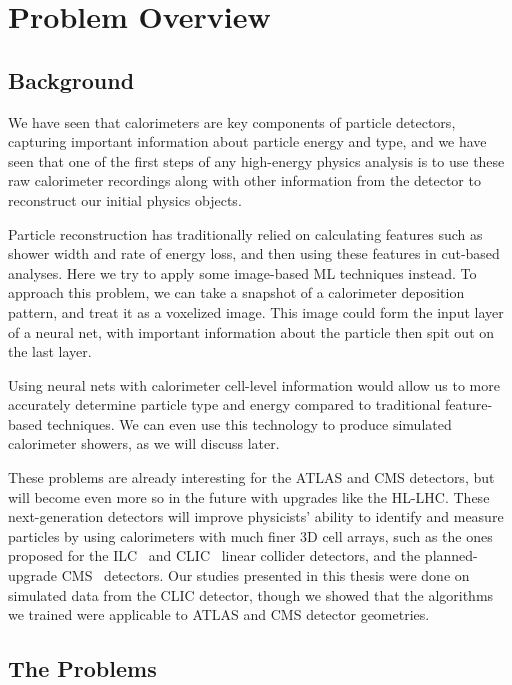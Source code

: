 \chapter{Problem Overview}

\section{Background}

We have seen that calorimeters are key components of particle detectors, capturing important information about particle energy and type, and we have seen that one of the first steps of any high-energy physics analysis is to use these raw calorimeter recordings along with other information from the detector to reconstruct our initial physics objects.

Particle reconstruction has traditionally relied on calculating features such as shower width and rate of energy loss, and then using these features in cut-based analyses. Here we try to apply some image-based ML techniques instead. To approach this problem, we can take a snapshot of a calorimeter deposition pattern, and treat it as a voxelized image. This image could form the input layer of a neural net, with important information about the particle then spit out on the last layer.

Using neural nets with calorimeter cell-level information would allow us to more accurately determine particle type and energy compared to traditional feature-based techniques. We can even use this technology to produce simulated calorimeter showers, as we will discuss later.

These problems are already interesting for the ATLAS and CMS detectors, but will become even more so in the future with upgrades like the HL-LHC. These next-generation detectors will improve physicists' ability to identify and measure particles by using calorimeters with much finer 3D cell arrays, such as the ones proposed for the ILC~\cite{ILC} and CLIC~\cite{CLIC} linear collider detectors, and the planned-upgrade CMS~\cite{CMSCollaboration:2015zni} detectors. Our studies presented in this thesis were done on simulated data from the CLIC detector, though we showed that the algorithms we trained were applicable to ATLAS and CMS detector geometries.

\section{The Problems}
\label{sec:problems}

